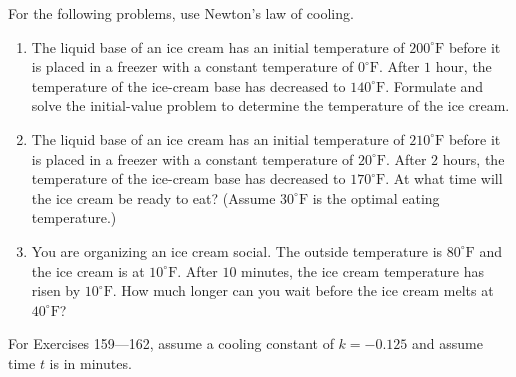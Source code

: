 \documentclass{exercises}
\begin{document}
For the following problems, use Newton's law of cooling.

\begin{enumerate}[resume]
\item The liquid base of an ice cream has an initial temperature of $200^\circ \text{F}$ before it is placed in a freezer with a constant temperature of $0^\circ \text{F}$. After $1$ hour, the temperature of the ice-cream base has decreased to $140^\circ \text{F}$. Formulate and solve the initial-value problem to determine the temperature of the ice cream.
\item \techrequired The liquid base of an ice cream has an initial temperature of $210^\circ \text{F}$ before it is placed in a freezer with a constant temperature of $20^\circ \text{F}$. After $2$ hours, the temperature of the ice-cream base has decreased to $170^\circ \text{F}$. At what time will the ice cream be ready to eat? (Assume $30^\circ \text{F}$ is the optimal eating temperature.)
\item \techrequired You are organizing an ice cream social. The outside temperature is $80^\circ \text{F}$ and the ice cream is at $10^\circ \text{F}$. After $10$ minutes, the ice cream temperature has risen by $10^\circ \text{F}$. How much longer can you wait before the ice cream melts at $40^\circ \text{F}$?
\end{enumerate}

For Exercises 159---162, assume a cooling constant of $k=-0.125$ and assume time $t$ is in minutes.
\end{document}
